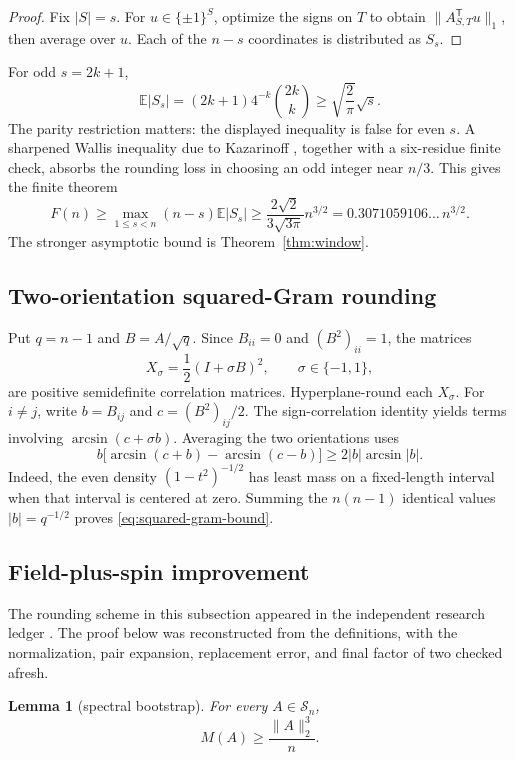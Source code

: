 \documentclass[11pt]{article}
\newtheorem{lemma}[theorem]{Lemma}
\theoremstyle{definition}
\theoremstyle{remark}
\newcommand{\Sn}{\mathcal S_n}
\newcommand{\E}{\mathbb E}
\begin{document}
\begin{proof}
Fix $|S|=s$.  For $u\in\{\pm1\}^S$, optimize the signs on $T$ to obtain
$\|A_{S,T}^{\mathsf T}u\|_1$, then average over $u$.  Each of the $n-s$
coordinates is distributed as $S_s$.
\end{proof}

For odd $s=2k+1$,
\[
 \E|S_s|=(2k+1)4^{-k}\binom{2k}{k}
 \ge\sqrt{\frac2\pi}\sqrt{s}.
\]
The parity restriction matters: the displayed inequality is false for even
$s$.  A sharpened Wallis inequality due to Kazarinoff \cite{kazarinoff},
together with a six-residue finite check, absorbs the rounding loss in choosing
an odd integer near $n/3$.  This gives the finite theorem
\begin{equation}\label{eq:first-lower}
 F(n)\ge \max_{1\le s<n}(n-s)\E|S_s|
 \ge \frac{2\sqrt2}{3\sqrt{3\pi}}n^{3/2}
 =0.3071059106\ldots\,n^{3/2}.
\end{equation}
The stronger asymptotic bound is Theorem~\ref{thm:window}.

\subsection{Two-orientation squared-Gram rounding}

Put $q=n-1$ and $B=A/\sqrt q$.  Since $B_{ii}=0$ and
$(B^2)_{ii}=1$, the matrices
\[
 X_\sigma=\frac12(I+\sigma B)^2,
 \qquad \sigma\in\{-1,1\},
\]
are positive semidefinite correlation matrices.  Hyperplane-round each
$X_\sigma$.  For $i\ne j$, write
$b=B_{ij}$ and $c=(B^2)_{ij}/2$.  The sign-correlation identity yields
terms involving $\arcsin(c+\sigma b)$.  Averaging the two orientations uses
\[
 b\bigl[\arcsin(c+b)-\arcsin(c-b)\bigr]
 \ge2|b|\arcsin|b|.
\]
Indeed, the even density $(1-t^2)^{-1/2}$ has least mass on a fixed-length
interval when that interval is centered at zero.  Summing the
 $n(n-1)$ identical values $|b|=q^{-1/2}$ proves
 \eqref{eq:squared-gram-bound}.

\subsection{Field-plus-spin improvement}

The rounding scheme in this subsection appeared in the independent research
ledger \cite{beaumont-ledger}.  The proof below was reconstructed from the
definitions, with the normalization, pair expansion, replacement error, and
final factor of two checked afresh.

\begin{lemma}[spectral bootstrap]\label{lem:spectral-bootstrap}
For every $A\in\Sn$,
\[
 M(A)\ge\frac{\|A\|_2^3}{n}.
\]
\end{lemma}
\end{document}
